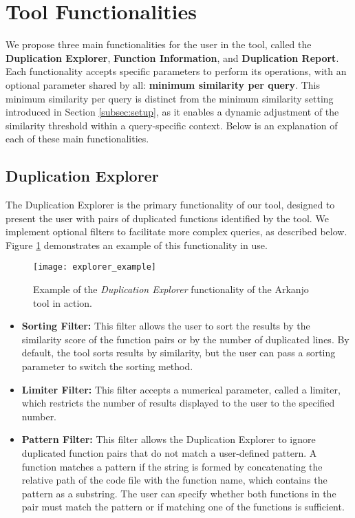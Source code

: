 \en

\section{Tool Functionalities}
\label{subsec:func}

We propose three main functionalities for the user in the tool, called the \textbf{Duplication Explorer}, \textbf{Function Information}, and \textbf{Duplication Report}. Each functionality accepts specific parameters to perform its operations, with an optional parameter shared by all: \textbf{minimum similarity per query}. This minimum similarity per query is distinct from the minimum similarity setting introduced in Section \ref{subsec:setup}, as it enables a dynamic adjustment of the similarity threshold within a query-specific context. Below is an explanation of each of these main functionalities.

\subsection{Duplication Explorer}

The Duplication Explorer is the primary functionality of our tool, designed to present the user with pairs of duplicated functions identified by the tool. We implement optional filters to facilitate more complex queries, as described below. Figure \ref{fig:explorer_ex} demonstrates an example of this functionality in use.

\begin{figure}
\texttt{[image: explorer\_example]}
\caption{Example of the \textit{Duplication Explorer} functionality of the Arkanjo tool in action.}
\label{fig:explorer_ex}
\end{figure}

\begin{itemize}
	\item \textbf{Sorting Filter:} This filter allows the user to sort the results by the similarity score of the function pairs or by the number of duplicated lines. By default, the tool sorts results by similarity, but the user can pass a sorting parameter to switch the sorting method.

	\item \textbf{Limiter Filter:} This filter accepts a numerical parameter, called a limiter, which restricts the number of results displayed to the user to the specified number.

	\item \textbf{Pattern Filter:} This filter allows the Duplication Explorer to ignore duplicated function pairs that do not match a user-defined pattern. A function matches a pattern if the string is formed by concatenating the relative path of the code file with the function name, which contains the pattern as a substring. The user can specify whether both functions in the pair must match the pattern or if matching one of the functions is sufficient.
\end{itemize}

